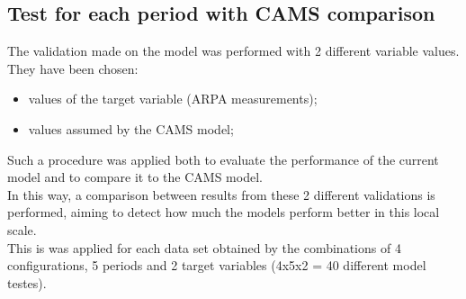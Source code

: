 \subsection{Test for each period with CAMS comparison}
The validation made on the model was performed with 2 different variable values. They have been chosen:
\begin{itemize}
\item values of the target variable (ARPA measurements);
\item values assumed by the CAMS model;
\end{itemize}
Such a procedure was applied both to evaluate the performance of the current model and to compare it to the CAMS model.\\
In this way, a comparison between results from these 2 different validations is performed, aiming to detect how much the models perform better in this local scale.\\
This is was applied for each data set obtained by the combinations of 4 configurations, 5 periods and 2 target variables (4x5x2 = 40 different model testes). 
